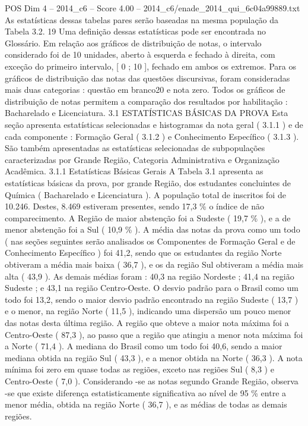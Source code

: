 \begin{textsample}{POS Dim 4 – 2014\_c6 – Score 4.00 – 2014\_c6/enade\_2014\_qui\_6c04a99889.txt}
As estatísticas dessas tabelas pares serão baseadas na mesma população da Tabela 3.2. 19 Uma definição dessas estatísticas pode ser encontrada no Glossário.
Em relação aos gráficos de distribuição de notas, o intervalo considerado foi de 10 unidades, aberto à esquerda e fechado à direita, com exceção do primeiro intervalo, [ 0 ; 10 ], fechado em ambos os extremos.
Para os gráficos de distribuição das notas das questões discursivas, foram consideradas mais duas categorias : questão em branco20 e nota zero.
Todos os gráficos de distribuição de notas permitem a comparação dos resultados por habilitação : Bacharelado e Licenciatura. 3.1 ESTATÍSTICAS BÁSICAS DA PROVA Esta seção apresenta estatísticas selecionadas e histogramas da nota geral ( 3.1.1 ) e de cada componente : Formação Geral ( 3.1.2 ) e Conhecimento Específico ( 3.1.3 ).
São também apresentadas as estatísticas selecionadas de subpopulações caracterizadas por Grande Região, Categoria Administrativa e Organização Acadêmica. 3.1.1 Estatísticas Básicas Gerais A Tabela 3.1 apresenta as estatísticas básicas da prova, por grande Região, dos estudantes concluintes de Química ( Bacharelado e Licenciatura ).
A população total de inscritos foi de 10.246.
Destes, 8.469 estiveram presentes, sendo 17,3 \% o índice de não comparecimento.
A Região de maior abstenção foi a Sudeste ( 19,7 \% ), e a de menor abstenção foi a Sul ( 10,9 \% ).
A média das notas da prova como um todo ( nas seções seguintes serão analisados os Componentes de Formação Geral e de Conhecimento Específico ) foi 41,2, sendo que os estudantes da região Norte obtiveram a média mais baixa ( 36,7 ), e os da região Sul obtiveram a média mais alta ( 43,9 ).
As demais médias foram : 40,3 na região Nordeste ; 41,4 na região Sudeste ; e 43,1 na região Centro-Oeste.
O desvio padrão para o Brasil como um todo foi 13,2, sendo o maior desvio padrão encontrado na região Sudeste ( 13,7 ) e o menor, na região Norte ( 11,5 ), indicando uma dispersão um pouco menor das notas desta última região.
A região que obteve a maior nota máxima foi a Centro-Oeste ( 87,3 ), ao passo que a região que atingiu a menor nota máxima foi a Norte ( 71,4 ).
A mediana do Brasil como um todo foi 40,6, sendo a maior mediana obtida na região Sul ( 43,3 ), e a menor obtida na Norte ( 36,3 ).
A nota mínima foi zero em quase todas as regiões, exceto nas regiões Sul ( 8,3 ) e Centro-Oeste ( 7,0 ).
Considerando -se as notas segundo Grande Região, observa -se que existe diferença estatisticamente significativa ao nível de 95 \% entre a menor média, obtida na região Norte ( 36,7 ), e as médias de todas as demais regiões.

\end{textsample}
